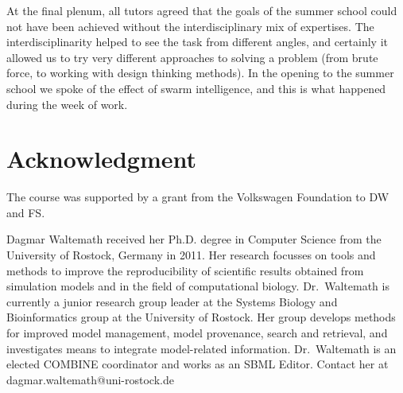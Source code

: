 \documentclass[journal,transmag]{IEEEtran}
\begin{document}
At the final plenum, all tutors agreed that the goals of the summer school could not have been achieved without the interdisciplinary mix of expertises. 
The interdisciplinarity helped to see the task from different angles, and certainly it allowed us to try very different approaches to solving a problem (from brute force, to working with design thinking methods). 
In the opening to the summer school we spoke of the effect of swarm intelligence, and this is what happened during the week of work.


\section*{Acknowledgment}
The course was supported by a grant from the Volkswagen Foundation to DW and FS. 

\ifCLASSOPTIONcaptionsoff
  \newpage
\fi




% 

\begin{IEEEbiography}{Dagmar Waltemath}
received her Ph.D. degree in Computer Science from the University of Rostock, Germany in 2011. 
Her research focusses on tools and methods to improve the reproducibility of scientific results obtained from simulation models and in the field of computational biology. 
Dr.~Waltemath is currently a junior research group leader at the Systems Biology and Bioinformatics group at the University of Rostock. 
Her group develops methods for improved model management, model provenance, search and retrieval, and investigates means to integrate model-related information.  
Dr.~Waltemath is an elected COMBINE coordinator and works as an SBML Editor. 
Contact her at dagmar.waltemath@uni-rostock.de
\end{IEEEbiography}
\end{document}
